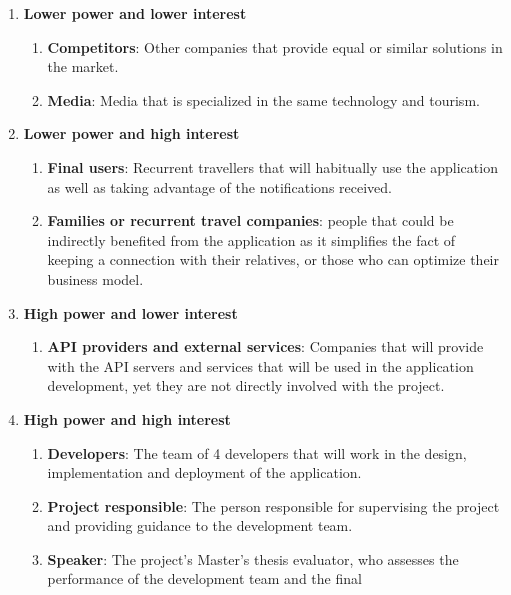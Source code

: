 \documentclass[../memory.tex]{subfiles}
\begin{document}
\begin{enumerate}[label = -]
	\item \textbf{Lower power and lower interest}
	      \begin{enumerate}[label = -]
		      \item \textbf{Competitors}: Other companies that provide equal or
		            similar solutions in the market.
		      \item \textbf{Media}: Media that is specialized in the same technology
		            and tourism.
	      \end{enumerate}
	\item \textbf{Lower power and high interest}
	      \begin{enumerate}[label = -]
		      \item \textbf{Final users}: Recurrent travellers that will habitually
		            use the application as well as taking advantage of the
		            notifications received.
		      \item \textbf{Families or recurrent travel companies}: people that
		            could be indirectly benefited from the application as it
		            simplifies the fact of keeping a connection with their
		            relatives, or those who can optimize their business model.
	      \end{enumerate}
	\item \textbf{High power and lower interest}
	      \begin{enumerate}[label = -]
		      \item \textbf{API providers and external services}: Companies that
		            will provide with the API servers and services that will be used
		            in the application development, yet they are not directly
		            involved with the project.
	      \end{enumerate}
	\item \textbf{High power and high interest}
	      \begin{enumerate}[label = -]
		      \item \textbf{Developers}: The team of 4 developers that will work in
		            the design, implementation and deployment of the application.
		      \item \textbf{Project responsible}: The person responsible for
		            supervising the project and providing guidance to the
		            development team.
		      \item \textbf{Speaker}: The project's Master's thesis evaluator, who
		            assesses the performance of the development team and the final

\end{enumerate}
\end{enumerate}
\end{document}
